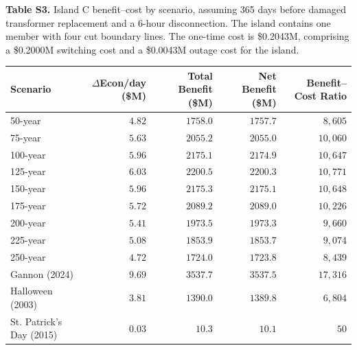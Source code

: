 \documentclass[draft]{agutexSI2019}
\begin{document}
\begin{center}
\textbf{Table S3.} Island C benefit--cost by scenario, assuming 365 days before damaged transformer replacement and a 6-hour disconnection. The island contains one member with four cut boundary lines. The one-time cost is \$0.2043M, comprising a \$0.2000M switching cost and a \$0.0043M outage cost for the island.\\[6pt]
\footnotesize
\begin{tabular}{lrrrr}
\hline
Scenario & $\Delta$Econ/day (\$M) & Total Benefit (\$M) & Net Benefit (\$M) & Benefit--Cost Ratio \\
\hline
50-year            & $4.82$ & $1758.0$ & $1757.7$ & $8{,}605$ \\
75-year            & $5.63$ & $2055.2$ & $2055.0$ & $10{,}060$ \\
100-year           & $5.96$ & $2175.1$ & $2174.9$ & $10{,}647$ \\
125-year           & $6.03$ & $2200.5$ & $2200.3$ & $10{,}771$ \\
150-year           & $5.96$ & $2175.3$ & $2175.1$ & $10{,}648$ \\
175-year           & $5.72$ & $2089.2$ & $2089.0$ & $10{,}226$ \\
200-year           & $5.41$ & $1973.5$ & $1973.3$ & $9{,}660$ \\
225-year           & $5.08$ & $1853.9$ & $1853.7$ & $9{,}074$ \\
250-year           & $4.72$ & $1724.0$ & $1723.8$ & $8{,}439$ \\
Gannon (2024)      & $9.69$  & $3537.7$ & $3537.5$ & $17{,}316$ \\
Halloween (2003)   & $3.81$  & $1390.0$ & $1389.8$ & $6{,}804$ \\
St. Patrick's Day (2015) & $0.03$ & $10.3$ & $10.1$ & $50$ \\
\hline
\end{tabular}
\end{center}
\end{document}
